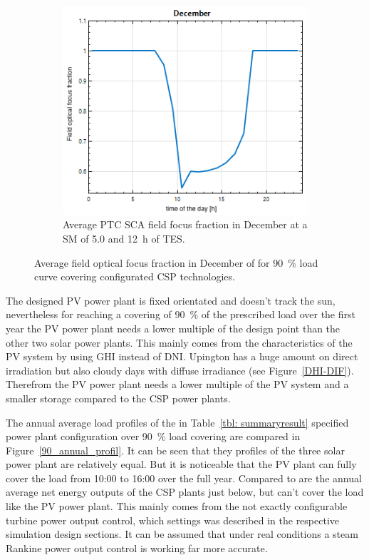 \begin{figure}[!htbp]
\begin{subfigure}[b]{0.5\textwidth}
                \includegraphics[width=1\textwidth]{FIG/FocusFraction/DecemberPTC}
                \caption{Average PTC SCA field focus fraction in December at a SM of 5.0 and 12~h of TES.}\label{DecemberPTC}
        \end{subfigure}
        \caption[Average field optical focus fraction in December of for 90~\% load curve covering configurated CSP technologies.]{Average field optical focus fraction in December of for 90~\% load curve covering configurated CSP technologies.}\label{FocusFraction}
\end{figure}

The designed PV power plant is fixed orientated and doesn't track the sun, nevertheless for reaching a covering of 90~\% of the prescribed load over the first year the PV power plant needs a lower multiple of the design point than the other two solar power plants. This mainly comes from the characteristics of the PV system by using GHI instead of DNI. Upington has a huge amount on direct irradiation but also cloudy days with diffuse irradiance (see Figure~\ref{DHI-DIF}). Therefrom the PV power plant needs a lower multiple of the PV system and a smaller storage compared to the CSP power plants.

The annual average load profiles of the in Table~\ref{tbl: summaryresult} specified  power plant configuration over 90~\% load covering are compared in Figure~\ref{90_annual_profil}. It can be seen that they profiles of the three solar power plant are relatively equal. But it is noticeable that the PV plant can fully cover the load from 10:00 to 16:00 over the full year. Compared to are the annual average net energy outputs of the CSP plants just below, but can't cover the load like the PV power plant. This mainly comes from the not exactly configurable turbine power output control, which settings was described in the respective simulation design sections. It can be assumed that under real conditions a steam Rankine power output control is working far more accurate. 

